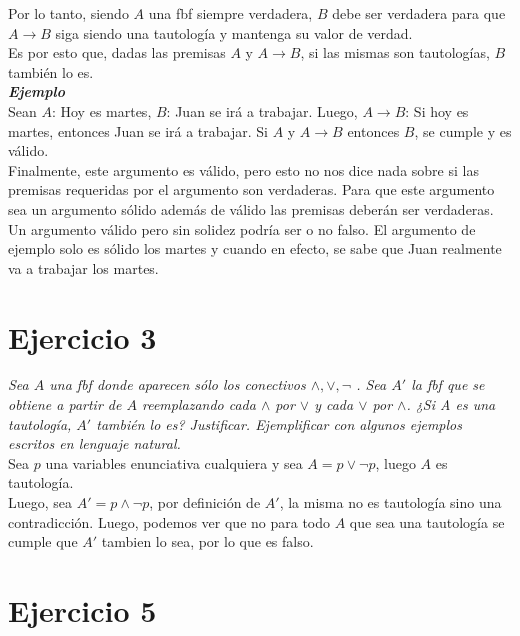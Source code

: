 \documentclass[osajnl,twocolumn,showpacs,superscriptaddress,10pt]{revtex4-1} %
\begin{document}
Por lo tanto, siendo $A$ una fbf siempre verdadera, $B$ debe ser verdadera para que $A \rightarrow B$ siga siendo una tautología y mantenga su valor de verdad. \\

Es por esto que, dadas las premisas $A$ y $A \rightarrow B$, si las mismas son tautologías, $B$ también lo es. \\

\textbf{\textit{Ejemplo}} \\

Sean $A$: Hoy es martes, $B$: Juan se irá a trabajar. Luego, $A \rightarrow B$: Si hoy es martes, entonces Juan se irá a trabajar. Si $A$ y $A \rightarrow B$ entonces $B$, se cumple y es válido. \\

Finalmente, este argumento es válido, pero esto no nos dice nada sobre si las premisas requeridas por el argumento son verdaderas. Para que este argumento sea un argumento sólido además de válido las premisas deberán ser verdaderas. \\

Un argumento válido pero sin solidez podría ser o no falso. El argumento de ejemplo solo es sólido los martes y cuando en efecto, se sabe que Juan realmente va a trabajar los martes. \\

\section{Ejercicio 3}

\textit{Sea $A$ una fbf donde aparecen sólo los conectivos $\wedge, \vee, \neg$ . Sea $A'$ la fbf que se obtiene a partir de $A$ reemplazando cada $\wedge$ por $\vee$ y cada $\vee$ por $\wedge$. ¿Si A es una tautología, $A'$ también lo es? Justificar. Ejemplificar con algunos ejemplos escritos en lenguaje natural.} \\

Sea $p$ una variables enunciativa cualquiera y sea $A = p \vee \neg p$, luego $A$ es tautología. \\

Luego, sea $A' = p \wedge \neg p$, por definición de $A'$, la misma no es tautología sino una contradicción. Luego, podemos ver que no para todo $A$ que sea una tautología se cumple que $A'$ tambien lo sea, por lo que es falso. \\

\section{Ejercicio 5}
\end{document}
